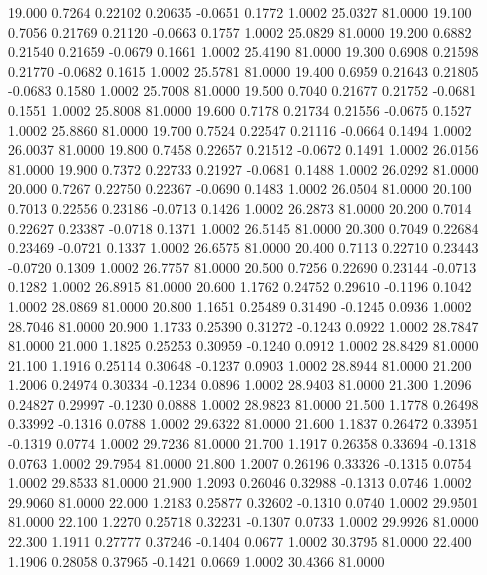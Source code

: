   19.000   0.7264   0.22102   0.20635  -0.0651   0.1772   1.0002  25.0327  81.0000
  19.100   0.7056   0.21769   0.21120  -0.0663   0.1757   1.0002  25.0829  81.0000
  19.200   0.6882   0.21540   0.21659  -0.0679   0.1661   1.0002  25.4190  81.0000
  19.300   0.6908   0.21598   0.21770  -0.0682   0.1615   1.0002  25.5781  81.0000
  19.400   0.6959   0.21643   0.21805  -0.0683   0.1580   1.0002  25.7008  81.0000
  19.500   0.7040   0.21677   0.21752  -0.0681   0.1551   1.0002  25.8008  81.0000
  19.600   0.7178   0.21734   0.21556  -0.0675   0.1527   1.0002  25.8860  81.0000
  19.700   0.7524   0.22547   0.21116  -0.0664   0.1494   1.0002  26.0037  81.0000
  19.800   0.7458   0.22657   0.21512  -0.0672   0.1491   1.0002  26.0156  81.0000
  19.900   0.7372   0.22733   0.21927  -0.0681   0.1488   1.0002  26.0292  81.0000
  20.000   0.7267   0.22750   0.22367  -0.0690   0.1483   1.0002  26.0504  81.0000
  20.100   0.7013   0.22556   0.23186  -0.0713   0.1426   1.0002  26.2873  81.0000
  20.200   0.7014   0.22627   0.23387  -0.0718   0.1371   1.0002  26.5145  81.0000
  20.300   0.7049   0.22684   0.23469  -0.0721   0.1337   1.0002  26.6575  81.0000
  20.400   0.7113   0.22710   0.23443  -0.0720   0.1309   1.0002  26.7757  81.0000
  20.500   0.7256   0.22690   0.23144  -0.0713   0.1282   1.0002  26.8915  81.0000
  20.600   1.1762   0.24752   0.29610  -0.1196   0.1042   1.0002  28.0869  81.0000
  20.800   1.1651   0.25489   0.31490  -0.1245   0.0936   1.0002  28.7046  81.0000
  20.900   1.1733   0.25390   0.31272  -0.1243   0.0922   1.0002  28.7847  81.0000
  21.000   1.1825   0.25253   0.30959  -0.1240   0.0912   1.0002  28.8429  81.0000
  21.100   1.1916   0.25114   0.30648  -0.1237   0.0903   1.0002  28.8944  81.0000
  21.200   1.2006   0.24974   0.30334  -0.1234   0.0896   1.0002  28.9403  81.0000
  21.300   1.2096   0.24827   0.29997  -0.1230   0.0888   1.0002  28.9823  81.0000
  21.500   1.1778   0.26498   0.33992  -0.1316   0.0788   1.0002  29.6322  81.0000
  21.600   1.1837   0.26472   0.33951  -0.1319   0.0774   1.0002  29.7236  81.0000
  21.700   1.1917   0.26358   0.33694  -0.1318   0.0763   1.0002  29.7954  81.0000
  21.800   1.2007   0.26196   0.33326  -0.1315   0.0754   1.0002  29.8533  81.0000
  21.900   1.2093   0.26046   0.32988  -0.1313   0.0746   1.0002  29.9060  81.0000
  22.000   1.2183   0.25877   0.32602  -0.1310   0.0740   1.0002  29.9501  81.0000
  22.100   1.2270   0.25718   0.32231  -0.1307   0.0733   1.0002  29.9926  81.0000
  22.300   1.1911   0.27777   0.37246  -0.1404   0.0677   1.0002  30.3795  81.0000
  22.400   1.1906   0.28058   0.37965  -0.1421   0.0669   1.0002  30.4366  81.0000
